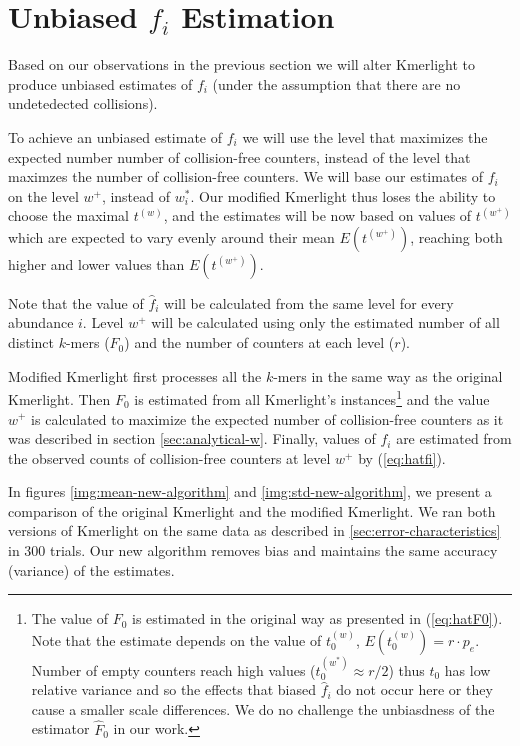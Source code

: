 \section{Unbiased $f_i$ Estimation}
\label{sec:unbiased-estimate}

Based on our observations in the previous section we will alter Kmerlight 
to produce unbiased estimates of $f_i$ (under the assumption that there are no undetedected
collisions).

To achieve an unbiased estimate of $f_i$ we will use the level that maximizes the
expected number number of collision-free counters, instead of the level that maximzes the number
of collision-free counters. We will base our estimates of $f_i$ on the level $w^+$, 
instead of $w_i^*$. Our modified Kmerlight thus loses the ability to choose the maximal 
$t^{(w)}$, and the estimates will be now based on values of $t^{(w^+)}$ which
are expected to vary evenly around their mean $E(t^{(w^+)})$, reaching both higher
and lower values than $E(t^{(w^+)})$.

Note that the value of $\hat f_i$ will be calculated from the same level for every abundance $i$.
Level $w^+$ will be calculated using only the estimated number of all distinct $k$-mers ($F_0$)
and the number of counters at each level ($r$).

Modified Kmerlight first processes all the $k$-mers in the same
way as the original Kmerlight. Then $F_0$ is estimated from all Kmerlight's instances\footnote{
The value of $F_0$ is estimated in the original way as presented in (\ref{eq:hatF0}).
Note that the estimate depends on the value of $t_0^{(w)}$, $E(t_0^{(w)}) = r \cdot p_e$. 
Number of empty counters reach high values ($t_0^{(w^*)} \approx r/2$) thus $t_0$ has low
relative variance and so the effects that biased $\hat f_i$ do not occur here or they cause 
a smaller scale differences. We do no challenge the unbiasdness of the estimator $\hat F_0$
in our work.
}
and the value $w^+$ is calculated to maximize the expected number of
collision-free counters as it was described in section \ref{sec:analytical-w}.
Finally, values of $f_i$ are estimated from the observed counts of 
collision-free counters at level $w^+$ by (\ref{eq:hatfi}).

In figures \ref{img:mean-new-algorithm} and \ref{img:std-new-algorithm}, we present a comparison
of the original Kmerlight and the modified Kmerlight. We ran both versions of Kmerlight
on the same data as described in \ref{sec:error-characteristics} in 300 trials. 
Our new algorithm removes bias and maintains the same accuracy (variance) of the estimates.


